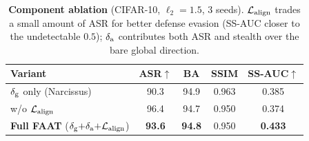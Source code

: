 \begin{table}[t]
\centering
\small
\begin{tabular}{l c c c c}
\toprule
Variant & ASR$\uparrow$ & BA & SSIM & SS-AUC$\uparrow$ \\
\midrule
$\delta_{\mathrm{g}}$ only (Narcissus)        & 90.3 & 94.9 & 0.963 & 0.385 \\
w/o $\mathcal{L}_{\mathrm{align}}$                      & 96.4 & 94.7 & 0.950 & 0.374 \\
\textbf{Full FAAT} ($\delta_{\mathrm{g}}{+}\delta_{\mathrm{a}}{+}\mathcal{L}_{\mathrm{align}}$) & \textbf{93.6} & \textbf{94.8} & 0.950 & \textbf{0.433} \\
\bottomrule
\end{tabular}
\caption{\textbf{Component ablation} (CIFAR-10, $\ell_2\!=\!1.5$, 3 seeds).
$\mathcal{L}_{\mathrm{align}}$ trades a small amount of ASR for better defense evasion (SS-AUC closer
to the undetectable $0.5$); $\delta_{\mathrm{a}}$ contributes both ASR and stealth over the
bare global direction.}
\label{tab:ablation}
\end{table}
